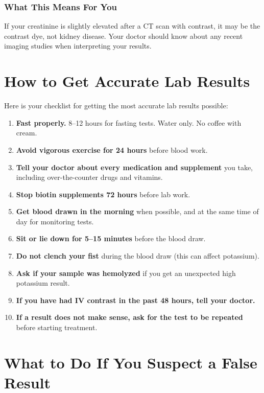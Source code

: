 \subsubsection{What This Means For You}

If your creatinine is slightly elevated after a CT scan with contrast, it may be the contrast dye, not kidney disease. Your doctor should know about any recent imaging studies when interpreting your results.

\clearpage
\section{How to Get Accurate Lab Results}

Here is your checklist for getting the most accurate lab results possible:

\begin{enumerate}
    \item \textbf{Fast properly.} 8--12 hours for fasting tests. Water only. No coffee with cream.
    \item \textbf{Avoid vigorous exercise for 24 hours} before blood work.
    \item \textbf{Tell your doctor about every medication and supplement} you take, including over-the-counter drugs and vitamins.
    \item \textbf{Stop biotin supplements 72 hours} before lab work.
    \item \textbf{Get blood drawn in the morning} when possible, and at the same time of day for monitoring tests.
    \item \textbf{Sit or lie down for 5--15 minutes} before the blood draw.
    \item \textbf{Do not clench your fist} during the blood draw (this can affect potassium).
    \item \textbf{Ask if your sample was hemolyzed} if you get an unexpected high potassium result.
    \item \textbf{If you have had IV contrast in the past 48 hours, tell your doctor.}
    \item \textbf{If a result does not make sense, ask for the test to be repeated} before starting treatment.
\end{enumerate}

\clearpage
\section{What to Do If You Suspect a False Result}

